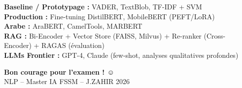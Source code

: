 \documentclass[a4paper,10pt]{article}
\begin{document}
\begin{keybox}
\textbf{Baseline / Prototypage :} VADER, TextBlob, TF-IDF + SVM\\
\textbf{Production :} Fine-tuning DistilBERT, MobileBERT (PEFT/LoRA)\\
\textbf{Arabe :} AraBERT, CamelTools, MARBERT\\
\textbf{RAG :} Bi-Encoder + Vector Store (FAISS, Milvus) + Re-ranker (Cross-Encoder) + RAGAS (évaluation)\\
\textbf{LLMs Frontier :} GPT-4, Claude (few-shot, analyses qualitatives profondes)
\end{keybox}

\vspace{6pt}
\begin{center}
\begin{tcolorbox}[colback=primary!10, colframe=primary, width=0.95\linewidth]
\centering
\textbf{Bon courage pour l'examen ! ☺}\\
{\small NLP -- Master IA FSSM -- J.ZAHIR 2026}
\end{tcolorbox}
\end{center}
\end{document}

